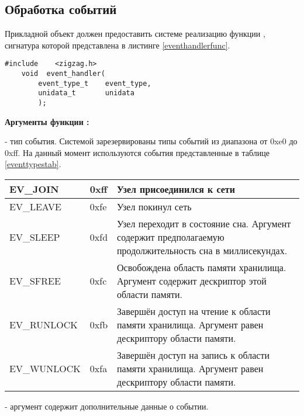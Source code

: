 \subsection{Обработка событий}

Прикладной объект должен предоставить системе \zigzag реализацию функции , сигнатура
которой представлена в листинге \ref{eventhandlerfunc}.

\begin{lstlisting}[caption=Функция \myfunc{event\_handler()} - обработчик событий., label=eventhandlerfunc ]
    #include    <zigzag.h>
    void  event_handler(
        event_type_t    event_type,
        unidata_t       unidata
        );
\end{lstlisting}

{\bfseries Аргументы функции :}
\begin{enumerate}

{\itshape
\item {} - тип события. Системой \zigzag зарезервированы типы событий из диапазона от 0xe0 до 0xff. На 
данный момент используются события представленные в таблице \ref{eventtypestab}.
}

\tabletail{\hline}
\tablelasttail{\hline}
\begin{supertabular}{|l|p{2cm}|p{8cm}|}
\label{eventtypestab}

   EV\_JOIN & 0xff & Узел присоединился к сети \\\hline
   EV\_LEAVE & 0xfe & Узел покинул сеть \\\hline
   EV\_SLEEP & 0xfd & Узел переходит в состояние сна. Аргумент  содержит предполагаемую продолжительность сна в миллисекундах. \\\hline
   EV\_SFREE & 0xfc & Освобождена область памяти хранилища. Аргумент  содержит дескриптор этой области памяти. \\\hline
   EV\_RUNLOCK & 0xfb & Завершён доступ на чтение к области памяти хранилища. Аргумент  равен дескриптору области памяти. \\\hline
   EV\_WUNLOCK & 0xfa & Завершён доступ на запись к области памяти хранилища. Аргумент  равен дескриптору области памяти. \\\hline
\end{supertabular}

{\itshape
\item {} - аргумент содержит дополнительные данные о событии.
}

\end{enumerate}

